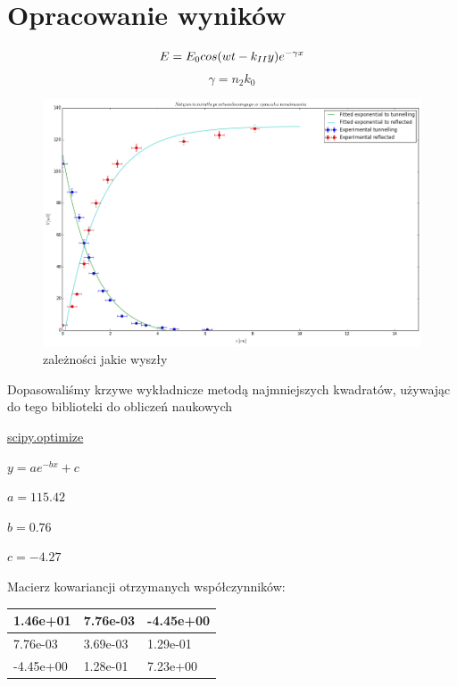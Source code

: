 \documentclass[a4paper,12pt]{article}
\begin{document}
\section{Opracowanie wyników}

$$
E = E_0cos(wt-k_{II}y)e^{-\gamma x} \\
$$
$$
\gamma = n_2k_0
$$
\begin{figure} [H]
  \begin{center}
    \includegraphics[width = 15cm]{prettier_plot.png}
    \caption{zależności jakie wyszły}
  \end{center}
\end{figure}

Dopasowaliśmy krzywe wykładnicze metodą najmniejszych kwadratów, używając do tego biblioteki do obliczeń naukowych 

\href{'http://docs.scipy.org/doc/scipy/reference/tutorial/optimize.html'}{scipy.optimize}


$y = a e^{-bx} + c$

$a = 115.42$

$b = 0.76$

$c = -4.27 $






Macierz kowariancji otrzymanych współczynników:

\begin{center}

    \begin{tabular}{ | m{5cm}| m{5cm} | m{5cm} |} \hline
    
    
    1.46e+01  &   7.76e-03 & -4.45e+00 \\ \hline

 	7.76e-03  & 3.69e-03  & 1.29e-01 \\ \hline
    
    -4.45e+00 &  1.28e-01 &  7.23e+00 \\ \hline
    \end{tabular}
\end{center}
\end{document}
